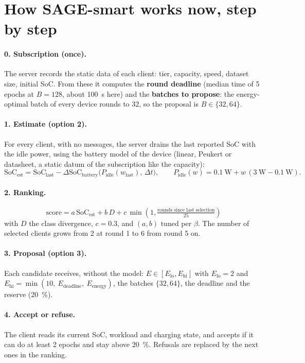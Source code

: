 \documentclass[11pt,a4paper]{article}
\begin{document}
\section{How SAGE-smart works now, step by step}

\paragraph{0. Subscription (once).} The server records the static data of each
client: tier, capacity, speed, dataset size, initial SoC. From these it computes
the \textbf{round deadline} (median time of 5 epochs at $B=128$, about
\SI{100}{\second} here) and the \textbf{batches to propose}: the energy-optimal
batch of every device rounds to 32, so the proposal is $B\in\{32,64\}$.

\paragraph{1. Estimate (option 2).} For every client, with no messages, the
server drains the last reported SoC with the idle power, using the battery
model of the device (linear, Peukert or datasheet, a static datum of the
subscription like the capacity):
\[
  \mathrm{SoC}_{\text{est}} = \mathrm{SoC}_{\text{last}}
  - \Delta\mathrm{SoC}_{\text{battery}}\big(P_{\text{idle}}(w_{\text{last}}),\,\Delta t\big),
  \qquad P_{\text{idle}}(w) = \SI{0.1}{\watt} + w\,(\SI{3}{\watt}-\SI{0.1}{\watt}).
\]

\paragraph{2. Ranking.}
\[
  \text{score} = a\,\mathrm{SoC}_{\text{est}} + b\,D + c\,\min\!\left(1, \tfrac{\text{rounds since last selection}}{25}\right)
\]
with $D$ the class divergence, $c=0.3$, and $(a,b)$ tuned per $\beta$. The
number of selected clients grows from 2 at round 1 to 6 from round 5 on.

\paragraph{3. Proposal (option 3).} Each candidate receives, without the model:
$E\in[E_{\text{lo}},E_{\text{hi}}]$ with $E_{\text{lo}}=2$ and
$E_{\text{hi}}=\min(10,\ E_{\text{deadline}},\ E_{\text{energy}})$, the batches
$\{32,64\}$, the deadline and the reserve (\SI{20}{\percent}).

\paragraph{4. Accept or refuse.} The client reads its current SoC, workload and
charging state, and accepts if it can do at least 2 epochs and stay above
\SI{20}{\percent}. Refusals are replaced by the next ones in the ranking.
\end{document}
